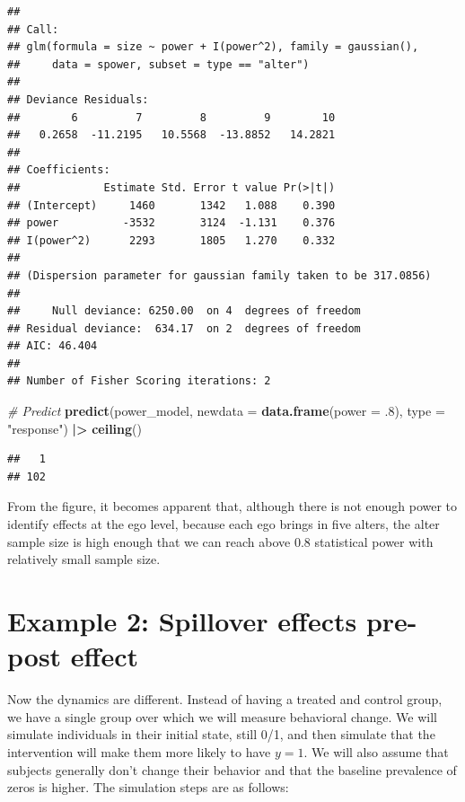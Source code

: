 \documentclass[
]{book}
\newenvironment{Shaded}{\begin{snugshade}}{\end{snugshade}}
\newcommand{\AttributeTok}[1]{\textcolor[rgb]{0.13,0.29,0.53}{#1}}
\newcommand{\CommentTok}[1]{\textcolor[rgb]{0.56,0.35,0.01}{\textit{#1}}}
\newcommand{\DecValTok}[1]{\textcolor[rgb]{0.00,0.00,0.81}{#1}}
\newcommand{\FunctionTok}[1]{\textcolor[rgb]{0.13,0.29,0.53}{\textbf{#1}}}
\newcommand{\NormalTok}[1]{#1}
\newcommand{\SpecialCharTok}[1]{\textcolor[rgb]{0.81,0.36,0.00}{\textbf{#1}}}
\newcommand{\StringTok}[1]{\textcolor[rgb]{0.31,0.60,0.02}{#1}}
\begin{document}
\begin{verbatim}
## 
## Call:
## glm(formula = size ~ power + I(power^2), family = gaussian(), 
##     data = spower, subset = type == "alter")
## 
## Deviance Residuals: 
##        6         7         8         9        10  
##   0.2658  -11.2195   10.5568  -13.8852   14.2821  
## 
## Coefficients:
##             Estimate Std. Error t value Pr(>|t|)
## (Intercept)     1460       1342   1.088    0.390
## power          -3532       3124  -1.131    0.376
## I(power^2)      2293       1805   1.270    0.332
## 
## (Dispersion parameter for gaussian family taken to be 317.0856)
## 
##     Null deviance: 6250.00  on 4  degrees of freedom
## Residual deviance:  634.17  on 2  degrees of freedom
## AIC: 46.404
## 
## Number of Fisher Scoring iterations: 2
\end{verbatim}

\begin{Shaded}
\begin{Highlighting}[]
\CommentTok{\# Predict}
\FunctionTok{predict}\NormalTok{(power\_model, }\AttributeTok{newdata =} \FunctionTok{data.frame}\NormalTok{(}\AttributeTok{power =}\NormalTok{ .}\DecValTok{8}\NormalTok{), }\AttributeTok{type =} \StringTok{"response"}\NormalTok{) }\SpecialCharTok{|\textgreater{}}
  \FunctionTok{ceiling}\NormalTok{()}
\end{Highlighting}
\end{Shaded}

\begin{verbatim}
##   1 
## 102
\end{verbatim}

From the figure, it becomes apparent that, although there is not enough power to identify effects at the ego level, because each ego brings in five alters, the alter sample size is high enough that we can reach above 0.8 statistical power with relatively small sample size.

\hypertarget{example-2-spillover-effects-pre-post-effect}{%
\section{Example 2: Spillover effects pre-post effect}\label{example-2-spillover-effects-pre-post-effect}}

Now the dynamics are different. Instead of having a treated and control group, we have a single group over which we will measure behavioral change. We will simulate individuals in their initial state, still 0/1, and then simulate that the intervention will make them more likely to have \(y = 1.\) We will also assume that subjects generally don't change their behavior and that the baseline prevalence of zeros is higher. The simulation steps are as follows:
\end{document}
